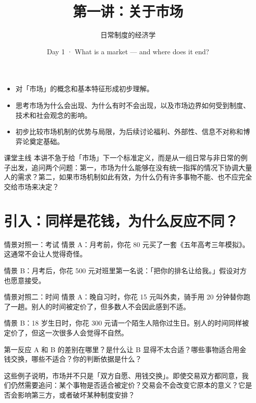 \documentclass[10pt,a4paper]{ctexart}
\title{\vspace{-2em}\bfseries 第一讲：关于市场}
\author{日常制度的经济学}
\date{Day 1 · What is a market — and where does it end?}
\begin{document}
\maketitle
\thispagestyle{fancy}

\begin{goalsbox}
\begin{itemize}
  \item 对「市场」的概念和基本特征形成初步理解。
  \item 思考市场为什么会出现、为什么有时不会出现，以及市场边界如何受到制度、技术和社会观念的影响。
  \item 初步比较市场机制的优势与局限，为后续讨论福利、外部性、信息不对称和博弈论奠定基础。
\end{itemize}
\end{goalsbox}

\begin{keybox}{课堂主线}
本讲不急于给「市场」下一个标准定义，而是从一组日常与非日常的例子出发，追问两个问题：第一，市场为什么能够在没有统一指挥的情况下协调大量人的需求？第二，如果市场机制如此有效，为什么仍有许多事物不能、也不应完全交给市场来决定？
\end{keybox}

\section{引入：同样是花钱，为什么反应不同？}

\begin{examplebox}{情景对照一：考试}
情景 A：月考前，你花 80 元买了一套《五年高考三年模拟》。这通常不会让人觉得奇怪。

情景 B：月考后，你花 500 元对班里第一名说：「把你的排名让给我。」假设对方也愿意接受。
\end{examplebox}

\begin{examplebox}{情景对照二：时间}
情景 A：晚自习时，你花 15 元叫外卖，骑手用 20 分钟替你跑了一趟。别人的时间被定价了，但多数人不会因此感到不适。

情景 B：18 岁生日时，你花 300 元请一个陌生人陪你过生日。别人的时间同样被定价了，但这一次很多人会觉得不自然。
\end{examplebox}

\begin{discussionbox}{第一反应}
A 和 B 的差别在哪里？是什么让 B 显得不太合适？哪些事物适合用金钱交换，哪些不适合？你的判断依据是什么？
\end{discussionbox}

这些例子说明，市场并不只是「双方自愿、用钱交换」。即使交易双方都同意，我们仍然需要追问：某个事物是否适合被定价？交易会不会改变它原本的意义？它是否会影响第三方，或者破坏某种制度安排？
\end{document}
